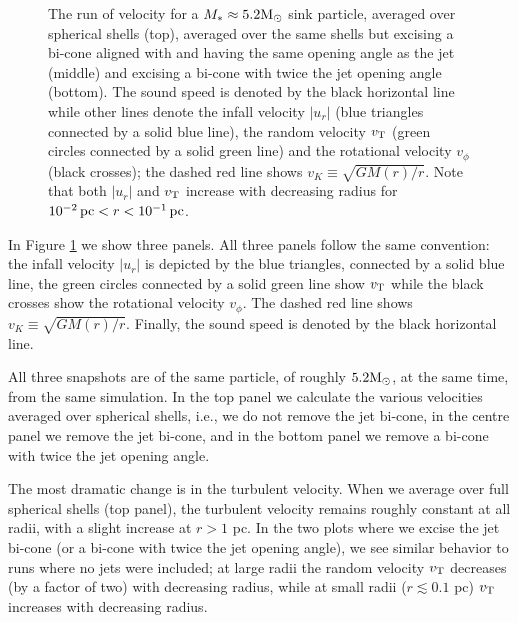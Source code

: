 \documentclass[../dissertation.tex]{subfiles}
\begin{document}
%
\begin{figure}[htb] %
  \caption[Jet - Effect of Subtracting the Jet cone]{The run of velocity for a $M_*\approx 5.2 {\rm M_\odot}$ sink particle, averaged over spherical shells (top), averaged over the same shells but excising a bi-cone aligned with and having the same opening angle as the jet (middle) and excising a bi-cone with twice the jet opening angle (bottom). The sound speed is denoted by the black horizontal line while other lines denote the infall velocity $ \lvert u_r \rvert$ (blue triangles connected by a solid blue line), the random velocity $v_{\rm T}$ (green circles connected by a solid green line) and the rotational velocity $v_\phi$ (black crosses); the dashed red line shows $v_K \equiv \sqrt{GM(r)/r}$. Note that both $\lvert u_r \rvert$ and $v_{\rm T}$ increase with decreasing radius for $10^{-2}{\rm\, pc}<r<10^{-1}{\rm \, pc}$. }
    \label{fig:jet_ideal_velocity}
\end{figure}
%

In Figure \ref{fig:jet_ideal_velocity} we show three panels.
All three panels follow the same convention: the infall velocity $ \lvert u_r \rvert$ is depicted by the blue triangles, connected by a solid blue line,
the green circles connected by a solid green line show $v_{\rm T}$ while the black crosses show the rotational velocity $v_\phi$. The dashed red line shows $v_K \equiv \sqrt{GM(r)/r}$.
Finally, the sound speed is denoted by the black horizontal line.

All three snapshots are of the same particle, of roughly $5.2 {\rm M_\odot}$, at the same time, from the same simulation.
In the top panel we calculate the various velocities averaged over spherical shells, i.e.,  we do not remove the jet bi-cone, in the centre panel we remove the jet bi-cone, and in the bottom panel we remove a bi-cone with twice the jet opening angle.

The most dramatic change is in the turbulent velocity.
When we average over full spherical shells (top panel), the turbulent velocity remains roughly constant at all radii, with a slight increase at $r>1$ pc.
In the two plots where we excise the jet bi-cone (or a bi-cone with twice the jet opening angle), we see similar behavior to runs where no jets were included; at large radii the random velocity $v_{\rm T}$ decreases (by a factor of two) with decreasing radius, while at small radii ($r\lesssim 0.1$ pc) $v_{\rm T}$ increases with decreasing radius.
\end{document}
